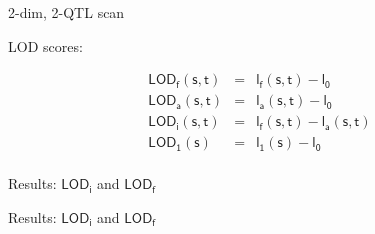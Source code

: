 \documentclass[aspectratio=169,12pt,t]{beamer}
\newcommand{\lod}{\text{LOD}}
\begin{document}
\begin{frame}{2-dim, 2-QTL scan}


LOD scores:

\vspace{5mm}

\hspace{1cm}
\begin{minipage}{5in}
{\lolit
\begin{eqnarray*}
\mathsf{\lod_f(s,t)}& = &\mathsf{l_f(s,t) - l_0} \\[24pt]
\mathsf{\lod_a(s,t)}& = &\mathsf{l_a(s,t) - l_0} \\[24pt]
\mathsf{\lod_i(s,t)}& = &\mathsf{l_f(s,t) - l_a(s,t)} \\[24pt]
\mathsf{\lod_1(s)}&   = &\mathsf{l_1(s) - l_0} \\[24pt]
\end{eqnarray*}
}

\end{minipage}
\end{frame}







\begin{frame}[c]{Results: $\mathsf{\lod_i}$ and $\mathsf{\lod_f}$}


\end{frame}







\begin{frame}[c]{Results: $\mathsf{\lod_i}$ and $\mathsf{\lod_f}$}


\end{frame}
\end{document}
